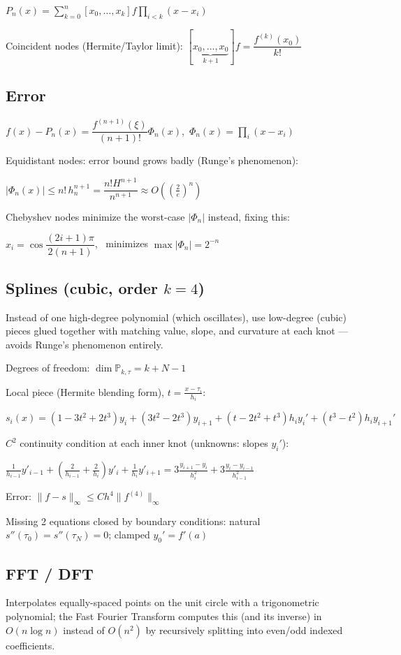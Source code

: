 \documentclass[11pt]{extarticle}
\begin{document}
$P_n(x)=\sum_{k=0}^n[x_0,\dots,x_k]f\prod_{i<k}(x-x_i)$

Coincident nodes (Hermite/Taylor limit): $[\underbrace{x_0,\dots,x_0}_{k+1}]f=\dfrac{f^{(k)}(x_0)}{k!}$

\subsection{Error}
$f(x)-P_n(x)=\dfrac{f^{(n+1)}(\xi)}{(n+1)!}\Phi_n(x)$,\ $\Phi_n(x)=\prod_i(x-x_i)$

Equidistant nodes: error bound grows badly (Runge's phenomenon):

$|\Phi_n(x)|\le n!\,h_n^{n+1}=\dfrac{n!H^{n+1}}{n^{n+1}}\approx O\!\left(\left(\tfrac2e\right)^n\right)$

Chebyshev nodes minimize the worst-case $|\Phi_n|$ instead, fixing this:

$x_i=\cos\dfrac{(2i{+}1)\pi}{2(n{+}1)}$, \ minimizes $\max|\Phi_n|=2^{-n}$

\subsection{Splines (cubic, order $k=4$)}
Instead of one high-degree polynomial (which oscillates), use low-degree (cubic) pieces glued together with matching value, slope, and curvature at each knot --- avoids Runge's phenomenon entirely.

Degrees of freedom: $\dim\mathbb P_{k,\tau}=k+N-1$

Local piece (Hermite blending form), $t=\tfrac{x-\tau_i}{h_i}$:

$s_i(x)=(1{-}3t^2{+}2t^3)y_i+(3t^2{-}2t^3)y_{i+1}+(t{-}2t^2{+}t^3)h_iy_i'+(t^3{-}t^2)h_iy_{i+1}'$

$C^2$ continuity condition at each inner knot (unknowns: slopes $y_i'$):

$\tfrac{1}{h_{i-1}}y'_{i-1}+\left(\tfrac{2}{h_{i-1}}{+}\tfrac{2}{h_i}\right)y'_i+\tfrac1{h_i}y'_{i+1}=3\tfrac{y_{i+1}-y_i}{h_i^2}+3\tfrac{y_i-y_{i-1}}{h_{i-1}^2}$

Error: $\|f-s\|_\infty\le Ch^4\|f^{(4)}\|_\infty$

Missing 2 equations closed by boundary conditions: natural $s''(\tau_0){=}s''(\tau_N){=}0$; clamped $y_0'{=}f'(a)$

\subsection{FFT / DFT}
Interpolates equally-spaced points on the unit circle with a trigonometric polynomial; the Fast Fourier Transform computes this (and its inverse) in $O(n\log n)$ instead of $O(n^2)$ by recursively splitting into even/odd indexed coefficients.
\end{document}

